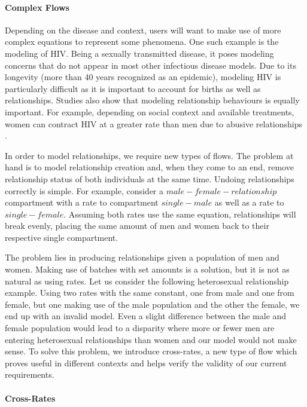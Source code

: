 \paragraph{Complex Flows}

Depending on the disease and context, users will want to make use of more complex equations to represent some phenomena. One such example is the modeling of HIV. Being a sexually transmitted disease, it poses modeling concerns that do not appear in most other infectious disease models. Due to its longevity (more than 40 years recognized as an epidemic), modeling HIV is particularly difficult as it is important to account for births as well as relationships. Studies also show that modeling relationship behaviours is equally important. For example, depending on social context and available treatments, women can contract HIV at a greater rate than men due to abusive relationships \cite{Woolfork2020-nt}. 

In order to model relationships, we require new types of flows. The problem at hand is to model relationship creation and, when they come to an end, remove relationship status of both individuals at the same time. Undoing relationships correctly is simple. For example, consider a $male-female-relationship$ compartment with a rate to compartment $single-male$ as well as a rate to $single-female$. Assuming both rates use the same equation, relationships will break evenly, placing the same amount of men and women back to their respective single compartment.

The problem lies in producing relationships given a population of men and women. Making use of batches with set amounts is a solution, but it is not as natural as using rates. Let us consider the following heterosexual relationship example. Using two rates with the same constant, one from male and one from female, but one making use of the male population and the other the female, we end up with an invalid model. Even a slight difference between the male and female population would lead to a disparity where more or fewer men are entering heterosexual relationships than women and our model would not make sense. To solve this problem, we introduce cross-rates, a new type of flow which proves useful in different contexts and helps verify the validity of our current requirements.

\paragraph{Cross-Rates}

